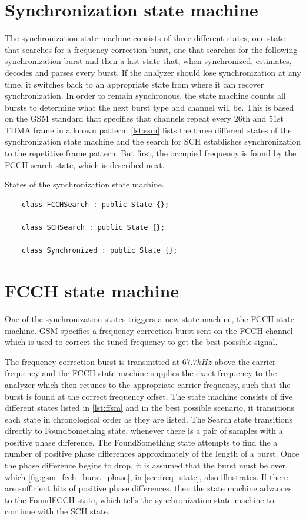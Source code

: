 \section{Synchronization state machine}
The synchronization state machine consists of three different states,
one state that searches for a frequency correction burst, one that
searches for the following synchronization burst and then a last state
that, when synchronized, estimates, decodes and parses every burst. If
the analyzer should lose synchronization at any time, it switches back
to an appropriate state from where it can recover synchronization. In
order to remain synchronous, the state machine counts all bursts to
determine what the next burst type and channel will be. This is based
on the \gls{GSM} standard that specifies that channels repeat every
$26$th and $51$st \gls{TDMA} frame in a known pattern. \cref{lst:ssm}
lists the three different states of the synchronization state machine
and the search for \gls{SCH} establishes synchronization to the
repetitive frame pattern. But first, the occupied frequency is found
by the \gls{FCCH} search state, which is described next.

\begin{listing}
  \caption{States of the synchronization state machine.}
  \label{lst:ssm}
  \begin{verbatim}
    class FCCHSearch : public State {};

    class SCHSearch : public State {};

    class Synchronized : public State {};
  \end{verbatim}
\end{listing}

\section{FCCH state machine}
One of the synchronization states triggers a new state machine, the
\gls{FCCH} state machine. \gls{GSM} specifies a frequency correction
burst sent on the \gls{FCCH} channel which is used to correct the
tuned frequency to get the best possible signal.

The frequency correction burst is transmitted at $67.7\si{kHz}$ above
the carrier frequency and the \gls{FCCH} state machine supplies the
exact frequency to the analyzer which then retunes to the appropriate
carrier frequency, such that the burst is found at the correct
frequency offset. The state machine consists of five different states
listed in \cref{lst:ffsm} and in the best possible scenario, it
transitions each state in chronological order as they are listed. The
Search state transitions directly to FoundSomething state, whenever
there is a pair of samples with a positive phase difference. The
FoundSomething state attempts to find the a number of positive phase
differences approximately of the length of a burst. Once the phase
difference begins to drop, it is assumed that the burst must be over,
which \cref{fig:gsm_fcch_burst_phase}, in \cref{sec:freq_state}, also
illustrates. If there are sufficient hits of positive phase
differences, then the state machine advances to the FoundFCCH state,
which tells the synchronization state machine to continue with the
\gls{SCH} state.

